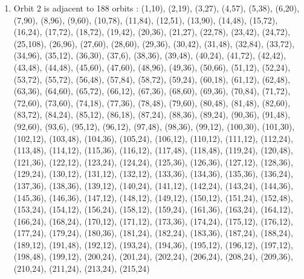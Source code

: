 \documentclass[12pt]{article}
\begin{document}
\begin{enumerate}
\item Orbit 2 is adjacent to 188 orbits : (1,10), (2,19), (3,27), (4,57), (5,38), (6,20), (7,90), (8,96), (9,60), (10,78), (11,84), (12,51), (13,90), (14,48), (15,72), (16,24), (17,72), (18,72), (19,42), (20,36), (21,27), (22,78), (23,42), (24,72), (25,108), (26,96), (27,60), (28,60), (29,36), (30,42), (31,48), (32,84), (33,72), (34,96), (35,12), (36,30), (37,6), (38,36), (39,48), (40,24), (41,72), (42,42), (43,48), (44,48), (45,60), (47,60), (48,96), (49,36), (50,66), (51,12), (52,24), (53,72), (55,72), (56,48), (57,84), (58,72), (59,24), (60,18), (61,12), (62,48), (63,36), (64,60), (65,72), (66,12), (67,36), (68,60), (69,36), (70,84), (71,72), (72,60), (73,60), (74,18), (77,36), (78,48), (79,60), (80,48), (81,48), (82,60), (83,72), (84,24), (85,12), (86,18), (87,24), (88,36), (89,24), (90,36), (91,48), (92,60), (93,6), (95,12), (96,12), (97,48), (98,36), (99,12), (100,30), (101,30), (102,12), (103,48), (104,36), (105,24), (106,12), (110,12), (111,12), (112,24), (113,48), (114,12), (115,36), (116,12), (117,48), (118,48), (119,24), (120,48), (121,36), (122,12), (123,24), (124,24), (125,36), (126,36), (127,12), (128,36), (129,24), (130,12), (131,12), (132,12), (133,36), (134,36), (135,36), (136,24), (137,36), (138,36), (139,12), (140,24), (141,12), (142,24), (143,24), (144,36), (145,36), (146,36), (147,12), (148,12), (149,12), (150,12), (151,24), (152,48), (153,24), (154,12), (156,24), (158,12), (159,24), (161,36), (163,24), (164,12), (166,24), (168,24), (170,12), (171,12), (173,36), (174,24), (175,12), (176,12), (177,24), (179,24), (180,36), (181,24), (182,24), (183,36), (187,24), (188,24), (189,12), (191,48), (192,12), (193,24), (194,36), (195,12), (196,12), (197,12), (198,48), (199,12), (200,24), (201,24), (202,24), (206,24), (208,24), (209,36), (210,24), (211,24), (213,24), (215,24)

\end{enumerate}
\end{document}
